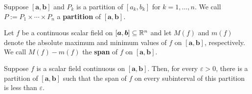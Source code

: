     \begin{definitionenv}
        Suppose $\left[ \bm a, \bm b \right]$ and $P_k$ is a partition of $[a_k, b_k]$ for $k=1, \ldots, n$. We call $P := P_1 \times \cdots \times P_n$ a \textbf{partition} of $[\bm a, \bm b]$. 
    \end{definitionenv}
    \begin{definitionenv}
        Let $f$ be a continuous scalar field on $[\bm a, \bm b] \subseteq \mathbb{R}^n$ and let $M(f)$ and $m(f)$ denote the absolute maximum and minimum values of $f$ on $[\bm a, \bm b]$, respectively. We call $M(f) - m(f)$ the \textbf{span} of $f$ on $[\bm a, \bm b]$.
    \end{definitionenv}
    \begin{theoremenv}\label{thm:small-span}
        Suppose $f$ is a scalar field continuous on $[\bm a, \bm b]$. Then, for every $\varepsilon > 0$, there is a partition of $[\bm a, \bm b]$ such that the span of $f$ on every subinterval of this partition is less than $\varepsilon$.
    \end{theoremenv}

    \newpage